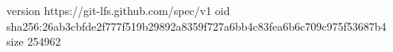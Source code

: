 version https://git-lfs.github.com/spec/v1
oid sha256:26ab3cbfde2f777f519b29892a8359f727a6bb4c83fea6b6c709c975f53687b4
size 254962
